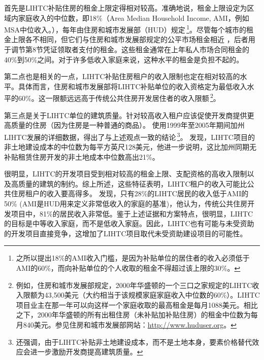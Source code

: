 \documentclass[lang=cn,11pt,a4paper]{paper}
\begin{document}
首先是LIHTC补贴住房的租金上限定得相对较高。准确地说，租金上限设定为区域内家庭收入的中位数，即18\%（Area Median Household Income, AMI，例如MSA中位收入。），每年由住房和城市发展部（HUD）规定\,\footnote{之所以提出18\%的AMI收入门槛，是因为补贴单位的居住者的收入必须低于AMI的60\%，而向补贴单位的个人收取的租金不得超过该上限的30\%。}。尽管每个城市的租金上限各不相同，但它们与住房和城市发展部规定的公平市场租金相近 \citep{Cummings1999257}，后者用于调节第8节凭证领取者支付的租金。这些租金通常在上年私人市场合同租金的40\%到50\%之间。对于许多低收入家庭来说，这种水平的租金是负担不起的。

第二点也是相关的一点，LIHTC补贴住房租户的收入限制也定在相对较高的水平。具体而言，住房和城市发展部将LIHTC补贴单位的收入资格定为最低收入水平的60\%。这一限额远远高于传统公共住房开发居住者的收入限额\,\footnote{例如，住房和城市发展部规定，2000年华盛顿的一个三口之家规定的LIHTC收入限额为43,500美元（大约相当于该规模家庭家庭收入中位数的60\%）。LIHTC项目业主在那一年可以向这样一个家庭收取的最高租金是每月1088美元。相比之下，2000年华盛顿的所有出租住房（未补贴加补贴住房）的租金中位数为每月840美元。参见住房和城市发展部网站：\url{http://www.huduser.org}。}。

第三点是关于LIHTC单位的建筑质量。针对较高收入租户应该促使开发商提供更高质量的住房（因为住房是一种普通的商品）。\cite{Eriksen2009141} 使用1999年至2005年期间加州LIHTC发展的详细数据，得出了与上述观点一致的结论\,\footnote{\cite{Eriksen2009141} 还强调，由于LIHTC补贴非土地建设成本，而不是土地本身，要素价格替代效应会进一步激励开发商提高建筑质量。}。\cite{Eriksen2009141} 发现，LIHTC项目的非土地建设成本的中位数为每平方英尺128美元，他进一步说明，这比加州同期无补贴租赁住房开发的非土地成本中位数高出21\%。

很明显，LIHTC的开发项目受到相对较高的租金上限、支配资格的高收入限制以及高质量的建筑的制约。综上所述，这些特征表明，LIHTC租户的收入可能比公共住房租户的收入要高得多。\cite{Wallace1995785} 发现，只有28\%的LIHTC居民的收入低于AMI的50\% (AMI是HUD用来定义非常低收入的家庭的基准)，他认为，传统公共住房开发项目中，81\%的居民收入非常低。鉴于上述证据和方案特点，很明显，LIHTC的目标是中等收入家庭，而不是低收入家庭。因此，LIHTC也有可能与未受资助的开发项目直接竞争，这增加了LIHTC项目取代未受资助建设项目的可能性。
\end{document}
